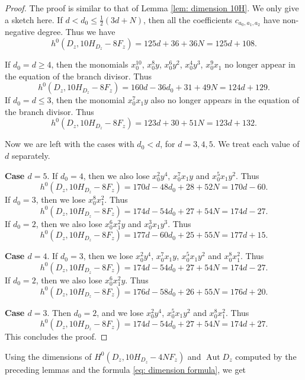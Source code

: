 \documentclass[a4paper,11pt]{amsart}
\DeclareMathOperator{\Aut}{Aut}
\theoremstyle{definition}
\theoremstyle{remark}
\numberwithin{equation}{section}
\begin{document}
\begin{proof}
	The proof is similar to that of Lemma \ref{lem: dimension 10H}. We only give a sketch here. If $d < d_0 \le \frac12(3d + N)$, then all the coefficients $c_{a_0,a_1,a_2}$ have non-negative degree. Thus we have
	$$
	h^0(D_z, 10H_{D_z} - 8F_z) = 125d + 36 + 36N = 125d + 108.
	$$

	If $d_0 = d \ge 4$, then the monomials $x_0^{10}$, $x_0^8y$, $x_0^6y^2$, $x_0^4y^3$, $x_0^9x_1$ no longer appear in the equation of the branch divisor. Thus
	$$
	h^0(D_z, 10H_{D_z} - 8F_z) = 160d - 36d_0 + 31 + 49N = 124d + 129.
	$$
    If $d_0 = d \le 3$, then the monomial $x_0^7x_1y$ also no longer appears in the equation of the branch divisor. Thus
    $$
    h^0(D_z, 10H_{D_z} - 8F_z) = 123d + 30 + 51N = 123d + 132.
    $$
    
    Now we are left with the cases with $d_0 < d$, for $d=3,4,5$. We treat each value of $d$ separately.
    
    \noindent\textbf{Case $d=5$}.
    If $d_0 = 4$, then we also lose $x_0^2y^4$, $x_0^7x_1y$ and $x_0^5x_1y^2$. Thus
	$$
	h^0(D_z, 10H_{D_z} - 8F_z) = 170d - 48d_0 + 28 + 52N = 170d - 60.
	$$
	If $d_0 = 3$, then we lose $x_0^8x_1^2$. Thus
	$$
	h^0(D_z, 10H_{D_z} - 8F_z) = 174d - 54d_0 + 27 + 54N = 174d - 27.
	$$
	If $d_0 = 2$, then we also lose $x_0^6x_1^2y$ and $x_0^3x_1y^3$. Thus
	$$
	h^0(D_z, 10H_{D_z} - 8F_z) = 177d - 60d_0 + 25 + 55N = 177d + 15.
	$$
    
    \noindent\textbf{Case $d=4$}. 
    If $d_0 = 3$, then we lose $x_0^2y^4$, $x_0^7x_1y$, $x_0^5x_1y^2$ and $x_0^8x_1^2$. Thus
	$$
	h^0(D_z, 10H_{D_z} - 8F_z) = 174d - 54d_0 + 27 + 54N = 174d - 27.
	$$
	If $d_0=2$, then we also lose $x_0^6x_1^2y$. Thus 
    $$
    h^0(D_z, 10H_{D_z} - 8F_z) = 176d - 58d_0 + 26 + 55N = 176d + 20.
    $$
    
    \noindent\textbf{Case $d=3$}. Then $d_0 = 2$, and we lose $x_0^2y^4$, $x_0^5x_1y^2$ and $x_0^8x_1^2$.
    Thus 
    $$
    h^0(D_z, 10H_{D_z} - 8F_z) = 174d - 54d_0 + 27 + 54N = 174d + 27.
    $$
    This concludes the proof.  
\end{proof}

Using the dimensions of $H^0(D_z, 10H_{D_z}-4NF_z)$ and $\Aut D_z$ computed by the preceding lemmas and the formula \eqref{eq: dimension formula}, we get
\end{document}
